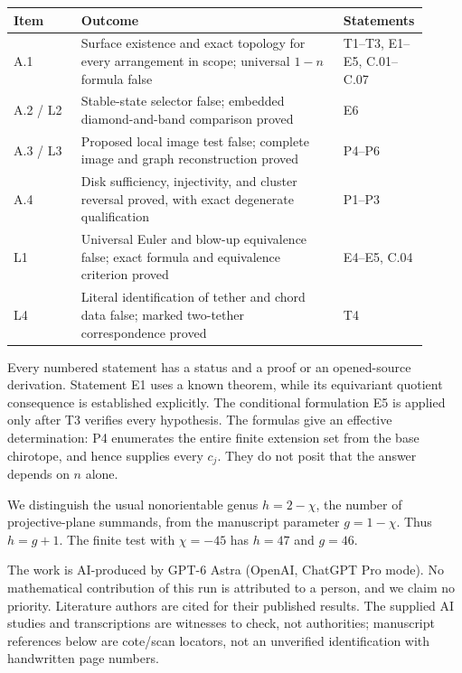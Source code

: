 \begin{center}\small
\begin{tabular}{p{0.16\linewidth}p{0.62\linewidth}p{0.13\linewidth}}
\toprule
Item & Outcome & Statements\\\midrule
A.1 & Surface existence and exact topology for every arrangement in scope; universal $1-n$ formula false & T1--T3, E1--E5, C.01--C.07\\
A.2 / L2 & Stable-state selector false; embedded diamond-and-band comparison proved & E6\\
A.3 / L3 & Proposed local image test false; complete image and graph reconstruction proved & P4--P6\\
A.4 & Disk sufficiency, injectivity, and cluster reversal proved, with exact degenerate qualification & P1--P3\\
L1 & Universal Euler and blow-up equivalence false; exact formula and equivalence criterion proved & E4--E5, C.04\\
L4 & Literal identification of tether and chord data false; marked two-tether correspondence proved & T4\\
\bottomrule
\end{tabular}
\end{center}

Every numbered statement has a status and a proof or an opened-source
derivation. Statement E1 uses a known theorem, while its equivariant
quotient consequence is established explicitly. The conditional
formulation E5 is applied only after T3 verifies every hypothesis.
The formulas give an effective determination: P4 enumerates the entire
finite extension set from the base chirotope, and hence supplies every
$c_j$. They do not posit that the answer depends on $n$ alone.

We distinguish the usual nonorientable genus $h=2-\chi$, the number of
projective-plane summands, from the manuscript parameter $g=1-\chi$.
Thus $h=g+1$. The finite test with $\chi=-45$ has $h=47$ and $g=46$.

The work is AI-produced by GPT-6 Astra (OpenAI, ChatGPT Pro mode).
No mathematical contribution of this run is attributed to a person,
and we claim no priority. Literature authors are cited for their
published results. The supplied AI studies and transcriptions are
witnesses to check, not authorities; manuscript references below are
cote/scan locators, not an unverified identification with handwritten
page numbers.
